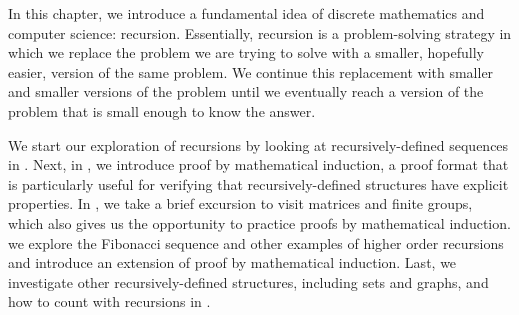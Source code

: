 In this chapter, we introduce a fundamental idea of discrete mathematics and computer science: recursion. Essentially, recursion is a problem-solving strategy in which we replace the problem we are trying to solve with a smaller, hopefully easier, version of the same problem.  We continue this replacement with smaller and smaller versions of the problem until we eventually reach a version of the problem that is small enough to know the answer.  

We start our exploration of recursions by looking at recursively-defined sequences in  {\secrecseq}.  Next, in  {\secmathind}, we introduce proof by mathematical induction, a proof format that is particularly useful for verifying that recursively-defined structures have explicit properties.  In  {\secmatrix}, we take a brief excursion to visit matrices and finite groups, which also gives us the opportunity to practice proofs by mathematical induction.   {\secfibhigher} we explore the Fibonacci sequence and other examples of higher order recursions and introduce an extension of proof by mathematical induction.  Last, we investigate other recursively-defined structures, including sets and graphs, and how to count with recursions in  {\secrecdefn}.


